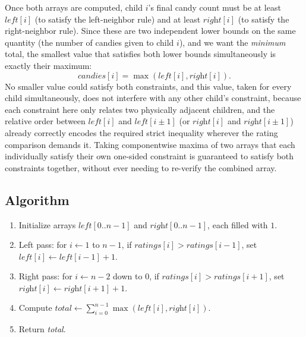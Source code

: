 Once both arrays are computed, child $i$'s final candy count must be at
least $\textit{left}[i]$ (to satisfy the left-neighbor rule) and at least
$\textit{right}[i]$ (to satisfy the right-neighbor rule). Since these are
two independent lower bounds on the same quantity (the number of candies
given to child $i$), and we want the \emph{minimum} total, the smallest
value that satisfies both lower bounds simultaneously is exactly their
maximum:
\[
  \textit{candies}[i] = \max(\textit{left}[i], \textit{right}[i]).
\]
No smaller value could satisfy both constraints, and this value, taken for
every child simultaneously, does not interfere with any other child's
constraint, because each constraint here only relates two physically
adjacent children, and the relative order between $\textit{left}[i]$ and
$\textit{left}[i\pm1]$ (or $\textit{right}[i]$ and $\textit{right}[i\pm1]$)
already correctly encodes the required strict inequality wherever the
rating comparison demands it. Taking componentwise maxima of two arrays that
each individually satisfy their own one-sided constraint is guaranteed to
satisfy both constraints together, without ever needing to re-verify the
combined array.

\subsection*{Algorithm}

\begin{enumerate}
  \item Initialize arrays $\textit{left}[0..n-1]$ and
        $\textit{right}[0..n-1]$, each filled with $1$.
  \item Left pass: for $i \gets 1$ to $n-1$, if
        $\textit{ratings}[i] > \textit{ratings}[i-1]$, set
        $\textit{left}[i] \gets \textit{left}[i-1] + 1$.
  \item Right pass: for $i \gets n-2$ down to $0$, if
        $\textit{ratings}[i] > \textit{ratings}[i+1]$, set
        $\textit{right}[i] \gets \textit{right}[i+1] + 1$.
  \item Compute $\textit{total} \gets \sum_{i=0}^{n-1} \max(\textit{left}[i],
        \textit{right}[i])$.
  \item Return \textit{total}.
\end{enumerate}

